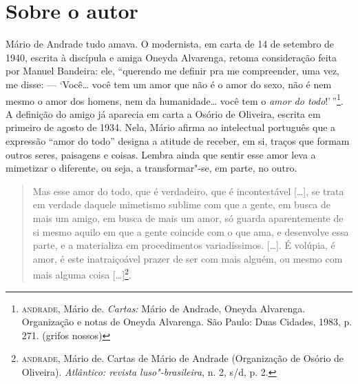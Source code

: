 
\section{Sobre o autor}

Mário de Andrade tudo amava. O modernista, em carta de 14 de setembro de
1940, escrita à discípula e amiga Oneyda Alvarenga, retoma consideração
feita por Manuel Bandeira: ele, ``querendo me definir pra me
compreender, uma vez, me disse: --- `Você\ldots{} você tem um amor que não é o
amor do sexo, não é nem mesmo o amor dos homens, nem da humanidade\ldots{}
você tem o \emph{amor do todo}!'\,''\footnote{\textsc{andrade}, Mário de.
  \emph{Cartas:} Mário de Andrade, Oneyda Alvarenga. Organização
  e notas de Oneyda Alvarenga. São Paulo: Duas Cidades, 1983, p. 271.
  (grifos nossos)}. A definição do amigo já aparecia em carta a Osório
de Oliveira, escrita em primeiro de agosto de 1934. Nela, Mário afirma
ao intelectual português que a expressão ``amor do todo'' designa a
atitude de receber, em si, traços que formam outros seres, paisagens e
coisas. Lembra ainda que sentir esse amor leva a mimetizar o diferente,
ou seja, a transformar"-se, em parte, no outro.

\begin{quote}
Mas esse amor do todo, que é verdadeiro, que é incontestável {[}\ldots{}{]},
se trata em verdade daquele mimetismo sublime com que a gente, em busca
de mais um amigo, em busca de mais um amor, só guarda aparentemente de
si mesmo aquilo em que a gente coincide com o que ama, e desenvolve essa
parte, e a materializa em procedimentos variadíssimos. {[}\ldots{}{]}. É
volúpia, é amor, é este inatraiçoável prazer de ser com mais alguém, ou
mesmo com mais alguma coisa {[}\ldots{}{]}\footnote{\textsc{andrade}, Mário de. Cartas de Mário de Andrade (Organização de Osório de Oliveira).
  \emph{Atlântico: revista luso"-brasileira}, n. 2, s/d, p. 2.}.
\end{quote}

